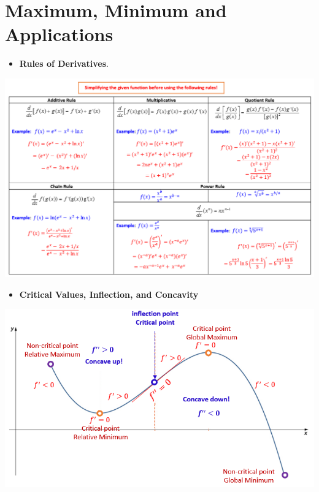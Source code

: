 \documentclass[
]{book}
\providecommand{\tightlist}{%
  \setlength{\itemsep}{0pt}\setlength{\parskip}{0pt}}
\begin{document}
\hypertarget{maximum-minimum-and-applications}{%
\chapter{Maximum, Minimum and Applications}\label{maximum-minimum-and-applications}}

\hfill\break

\begin{itemize}
\tightlist
\item
  \textbf{Rules of Derivatives}.
\end{itemize}

\begin{center}\includegraphics[width=0.99\linewidth]{img09/w09-RuleDerivatives} \end{center}

\hfill\break

\begin{itemize}
\tightlist
\item
  \textbf{Critical Values, Inflection, and Concavity}
\end{itemize}

\begin{center}\includegraphics[width=0.7\linewidth]{img09/w09-concavity} \end{center}
\end{document}
